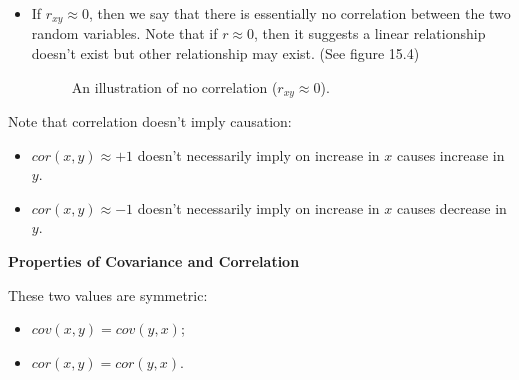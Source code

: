 \begin{itemize}
	\item If $r_{xy} \approx 0$, then we say that there is essentially no correlation between the two random variables. Note that if $r \approx 0$, then it suggests a linear relationship doesn't exist but other relationship may exist. (See figure 15.4)
\begin{figure}[h!]
\centering
{}
\caption{An illustration of no correlation ($r_{xy} \approx 0$).}
\end{figure}
\end{itemize}

Note that correlation doesn't imply causation:

\begin{itemize}
	\item $cor(x,y) \approx +1$ doesn't necessarily imply on increase in $x$ causes increase in $y$.
	\item $cor(x,y) \approx -1$ doesn't necessarily imply on increase in $x$ causes decrease in $y$.
\end{itemize}

\textbf{Properties of Covariance and Correlation}

These two values are symmetric:

\begin{itemize}
	\item $cov(x,y) = cov(y,x)$;
	\item $cor(x,y) = cor(y,x)$.
\end{itemize}

